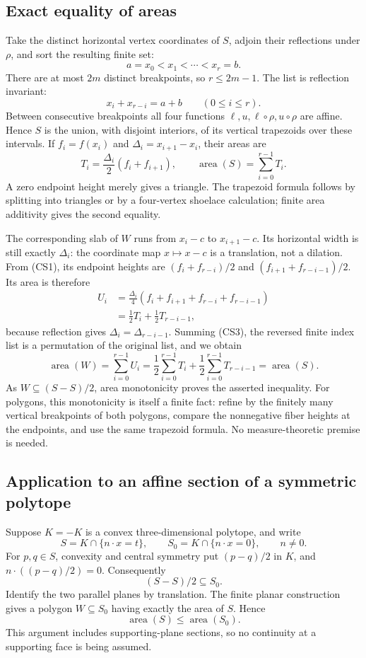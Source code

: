 \subsection{Exact equality of areas}
Take the distinct horizontal vertex coordinates of $S$, adjoin their
reflections under $\rho$, and sort the resulting finite set:
\[
 a=x_0<x_1<\cdots<x_r=b.
\]
There are at most $2m$ distinct breakpoints, so $r\le2m-1$.
The list is reflection invariant:
\[
 x_i+x_{r-i}=a+b \qquad(0\le i\le r).
\]
Between consecutive breakpoints all four functions
$\ell,u,\ell\circ\rho,u\circ\rho$ are affine.  Hence $S$ is the
union, with disjoint interiors, of its vertical trapezoids over these
intervals.  If $f_i=f(x_i)$ and $\Delta_i=x_{i+1}-x_i$, their areas are
\[
 T_i=\frac{\Delta_i}{2}(f_i+f_{i+1}),\qquad
 \operatorname{area}(S)=\sum_{i=0}^{r-1}T_i.          \tag{CS2}
\]
A zero endpoint height merely gives a triangle.  The trapezoid formula
follows by splitting into triangles or by a four-vertex shoelace
calculation; finite area additivity gives the second equality.

The corresponding slab of $W$ runs from $x_i-c$ to $x_{i+1}-c$.
Its horizontal width is still exactly $\Delta_i$: the coordinate map
$x\mapsto x-c$ is a translation, not a dilation.  From (CS1), its
endpoint heights are $(f_i+f_{r-i})/2$ and
$(f_{i+1}+f_{r-i-1})/2$.  Its area is therefore
\[
 \begin{split}
 U_i
 &=\frac{\Delta_i}{4}
      (f_i+f_{i+1}+f_{r-i}+f_{r-i-1})\\
 &=\frac12 T_i+\frac12 T_{r-i-1},
 \end{split}                                       \tag{CS3}
\]
because reflection gives $\Delta_i=\Delta_{r-i-1}$.
Summing (CS3), the reversed finite index list is a permutation of the
original list, and we obtain
\[
 \operatorname{area}(W)
 =\sum_{i=0}^{r-1}U_i
 =\frac12\sum_{i=0}^{r-1}T_i
  +\frac12\sum_{i=0}^{r-1}T_{r-i-1}
 =\operatorname{area}(S).                           \tag{CS4}
\]
As $W\subseteq(S-S)/2$, area monotonicity proves the asserted inequality.
For polygons, this monotonicity is itself a finite fact: refine by the
finitely many vertical breakpoints of both polygons, compare the
nonnegative fiber heights at the endpoints, and use the same trapezoid
formula.  No measure-theoretic premise is needed.

\subsection{Application to an affine section of a symmetric polytope}
Suppose $K=-K$ is a convex three-dimensional polytope, and write
\[
 S=K\cap\{n\cdot x=t\},\qquad
 S_0=K\cap\{n\cdot x=0\},\qquad n\ne0.
\]
For $p,q\in S$, convexity and central symmetry put $(p-q)/2$ in $K$,
and $n\cdot((p-q)/2)=0$.  Consequently
\[
 (S-S)/2\subseteq S_0.
\]
Identify the two parallel planes by translation.  The finite planar
construction gives a polygon $W\subseteq S_0$ having exactly the area
of $S$.  Hence
\[
 \boxed{\ \operatorname{area}(S)\le\operatorname{area}(S_0).\ }
\]
This argument includes supporting-plane sections, so no continuity at
a supporting face is being assumed.

